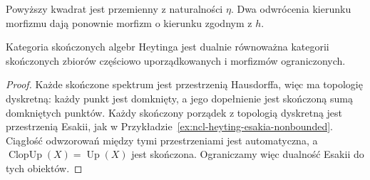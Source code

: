 \begin{center}
\end{center}
Powyższy kwadrat jest przemienny z naturalności
$\eta$. Dwa odwrócenia kierunku morfizmu
dają ponownie morfizm o kierunku zgodnym z $h$.

\begin{wniosek}
\label{cor:ncl-heyting-finite-duality}
Kategoria skończonych algebr Heytinga jest dualnie
równoważna kategorii skończonych zbiorów częściowo
uporządkowanych i morfizmów ograniczonych.
\end{wniosek}
\begin{proof}
Każde skończone spektrum jest przestrzenią
Hausdorffa, więc ma topologię dyskretną:
każdy punkt jest domknięty, a jego dopełnienie
jest skończoną sumą domkniętych punktów.
Każdy skończony porządek z topologią dyskretną
jest przestrzenią Esakii, jak w
Przykładzie~\ref{ex:ncl-heyting-esakia-nonbounded}.
Ciągłość odwzorowań między tymi przestrzeniami
jest automatyczna, a $\operatorname{ClopUp}(X)
=\operatorname{Up}(X)$ jest skończona.
Ograniczamy więc dualność Esakii do tych obiektów.
\end{proof}


